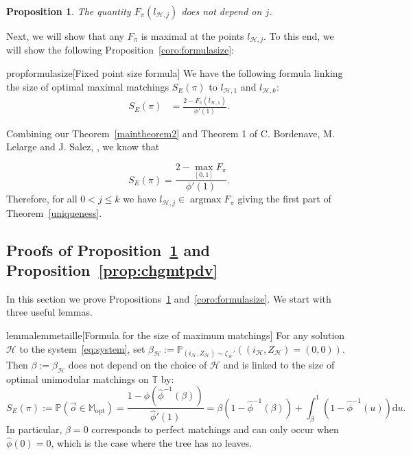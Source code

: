 \documentclass[11pt]{article}
\DeclareMathOperator*{\argmax}{argmax}
\newtheorem{prop}{Proposition}[section]
\begin{document}
\begin{prop}\label{prop:bordsgeneral}
The quantity $F_\pi(l_{\mathcal{H},j})$ does not depend on $j$.
\end{prop}

Next, we will show that any $F_\pi$ is maximal at the points $l_{\mathcal{H},j}$.  To this end, we will show the following Proposition~\ref{coro:formulasize}:


\begin{restatable}{prop}{formulasize}[Fixed point size formula]\label{coro:formulasize}
    We have the following formula linking the size of optimal maximal matchings $S_E(\pi)$ to $l_{\mathcal{H},1}$ and $l_{\mathcal{H},k}$:
    \begin{equation}\label{eq:formulasize}
    \begin{aligned}
        S_E(\pi)&=\frac{2-F_\pi(l_{\mathcal{H},1})}{\phi'(1)}.
    \end{aligned}
    \end{equation}
    \end{restatable}


Combining our Theorem~\ref{maintheorem2} and Theorem 1 of C. Bordenave, M. Lelarge and J. Salez, \cite{salez2011cavity}, we know that

\[
S_E(\pi) = \frac{2-\max_{[0,1]}F_\pi}{\phi'(1)}.
\]
Therefore, for all $0<j\leq k$ we have $l_{\mathcal{H},j} \in \argmax F_\pi$ giving the first part of Theorem~\ref{uniqueness}.


\subsection{Proofs of Proposition~\ref{prop:bordsgeneral} and Proposition~\ref{prop:chgmtpdv}}
In this section we prove Propositions~\ref{prop:bordsgeneral} and~\ref{coro:formulasize}. We start with three useful lemmas.

\begin{restatable}{lemma}{lemmetaille}[Formula for the size of maximum matchings]\label{lem:taille}
    For  any solution ${\mathcal{H}}$ to the system~\eqref{eq:system}, set $\beta_{\mathcal{H}}:=\mathbb{P}_{(i_{\mathcal{H}},Z_{\mathcal{H}})\sim \zeta_{\mathcal{H}}'}((i_{\mathcal{H}},Z_{\mathcal{H}})=(0,0))$.
 Then $\beta:=\beta_{\mathcal{H}}$ does not depend on the choice of $\mathcal{H}$ and is linked to the size of optimal unimodular matchings on $\mathbb{T}$ by:
    \begin{equation}\label{eq:sizezeroatom}
        S_E(\pi):= \mathbb{P}(\overset{\rightarrow}{o}\in \mathbb{M}_{\mathrm{opt}}) = \frac{1-\phi(\hat{\phi}^{-1}(\beta))}{\hat{\phi}'(1)}= \beta(1-\hat{\phi}^{-1}(\beta)) + \int_{\beta}^{1}(1-\hat{\phi}^{-1}(u))\mathrm{d}u.
    \end{equation}
    In particular, $\beta=0$ corresponds to perfect matchings and can only occur when $\hat{\phi}(0)=0$, which is the case where the tree has no leaves.
\end{restatable}
\end{document}
